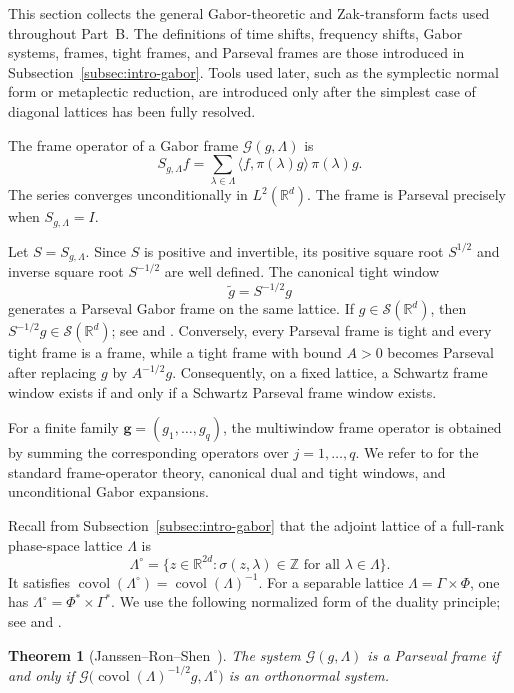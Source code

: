 \documentclass[11pt,reqno]{amsart}
\numberwithin{equation}{section}
\newtheorem{theorem}{Theorem}[section]
\theoremstyle{definition}
\theoremstyle{remark}
\newcommand{\R}{\mathbb R}
\newcommand{\Z}{\mathbb Z}
\newcommand{\covol}{\operatorname{covol}}
\newcommand{\G}{\mathcal G}
\newcommand{\Sclass}{\mathcal S}
\newcommand{\ip}[2]{\langle #1,#2\rangle}
\begin{document}
This section collects the general Gabor-theoretic and Zak-transform facts
used throughout Part~B.  The definitions of time shifts, frequency shifts,
Gabor systems, frames, tight frames, and Parseval frames are those introduced
in Subsection~\ref{subsec:intro-gabor}.  Tools used later, such as the
symplectic normal form or metaplectic reduction, are introduced only after the simplest case of
diagonal lattices has been fully resolved.

The frame operator of a Gabor frame $\G(g,\Lambda)$ is
\[
 S_{g,\Lambda}f
   =\sum_{\lambda\in\Lambda}
      \ip{f}{\pi(\lambda)g}\,\pi(\lambda)g.
\]
The series converges unconditionally in \(L^2(\R^d)\).  The frame is
Parseval precisely when \(S_{g,\Lambda}=I\).

Let \(S=S_{g,\Lambda}\).  Since \(S\) is positive and invertible, its positive square root \(S^{1/2}\) and inverse
square root \(S^{-1/2}\) are well defined.  The canonical tight window
\[
                         \widetilde g=S^{-1/2}g
\]
generates a Parseval Gabor frame on the same lattice.  If
\(g\in\Sclass(\R^d)\), then \(S^{-1/2}g\in\Sclass(\R^d)\); see
\cite{Luef2009Projections,JakobsenLuef2020} and
\cite[Chapters~12--13]{Grochenig2001}.  Conversely, every Parseval frame is
tight and every tight frame is a frame, while a tight frame with bound
\(A>0\) becomes Parseval after replacing \(g\) by \(A^{-1/2}g\).
Consequently, on a fixed lattice, a Schwartz frame window exists if and only if a Schwartz Parseval frame window exists.

For a finite family \(\mathbf g=(g_1,\ldots,g_q)\), the multiwindow frame
operator is obtained by summing the corresponding operators over
\(j=1,\ldots,q\).  We refer to
\cite[Chapters~5--7]{Grochenig2001} for the standard frame-operator theory,
canonical dual and tight windows, and unconditional Gabor expansions.

Recall from Subsection~\ref{subsec:intro-gabor} that the adjoint lattice of a full-rank phase-space lattice $\Lambda$ is
\[
 \Lambda^\circ=\{z\in\R^{2d}:\sigma(z,\lambda)\in\Z
 \text{ for all }\lambda\in\Lambda\}.
\]
It satisfies
\(
 \covol(\Lambda^\circ)=\covol(\Lambda)^{-1}.
\)
For a separable lattice $\Lambda=\Gamma\times\Phi$, one has
\(
                         \Lambda^\circ=\Phi^*\times\Gamma^*.
\)
We use the following normalized form of the duality principle; see
\cite{Janssen1995,RonShen1997,JakobsenLuef2020} and
\cite[Chapter~7]{Grochenig2001}.

\begin{theorem}[Janssen--Ron--Shen~\protect\cite{Janssen1995,RonShen1997}]\label{thm:gabor-duality}
The system $\G(g,\Lambda)$ is a Parseval frame if and only if
$\displaystyle \G\bigl(\covol(\Lambda)^{-1/2}g,\Lambda^\circ\bigr)$
is an orthonormal system.
\end{theorem}
\end{document}
